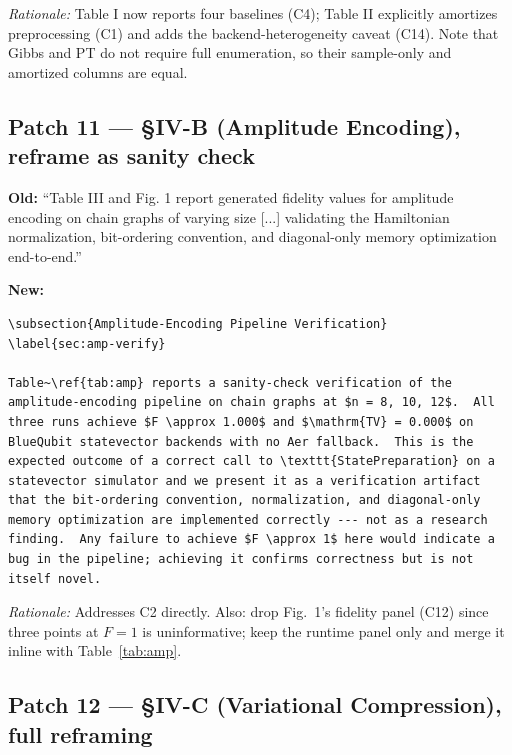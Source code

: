 \noindent\emph{Rationale:} Table I now reports four baselines (C4); Table II
explicitly amortizes preprocessing (C1) and adds the backend-heterogeneity
caveat (C14).  Note that Gibbs and PT do not require full enumeration, so
their sample-only and amortized columns are equal.

\subsection*{Patch 11 --- \S IV-B (Amplitude Encoding), reframe as
sanity check}

\textbf{Old:} ``Table III and Fig. 1 report generated fidelity values for
amplitude encoding on chain graphs of varying size [...] validating the
Hamiltonian normalization, bit-ordering convention, and diagonal-only memory
optimization end-to-end.''

\noindent\textbf{New:}

\begin{verbatim}
\subsection{Amplitude-Encoding Pipeline Verification}
\label{sec:amp-verify}

Table~\ref{tab:amp} reports a sanity-check verification of the
amplitude-encoding pipeline on chain graphs at $n = 8, 10, 12$.  All
three runs achieve $F \approx 1.000$ and $\mathrm{TV} = 0.000$ on
BlueQubit statevector backends with no Aer fallback.  This is the
expected outcome of a correct call to \texttt{StatePreparation} on a
statevector simulator and we present it as a verification artifact
that the bit-ordering convention, normalization, and diagonal-only
memory optimization are implemented correctly --- not as a research
finding.  Any failure to achieve $F \approx 1$ here would indicate a
bug in the pipeline; achieving it confirms correctness but is not
itself novel.
\end{verbatim}

\noindent\emph{Rationale:} Addresses C2 directly.  Also: drop Fig.\ 1's
fidelity panel (C12) since three points at $F = 1$ is uninformative; keep
the runtime panel only and merge it inline with Table~\ref{tab:amp}.

\subsection*{Patch 12 --- \S IV-C (Variational Compression),
full reframing}

